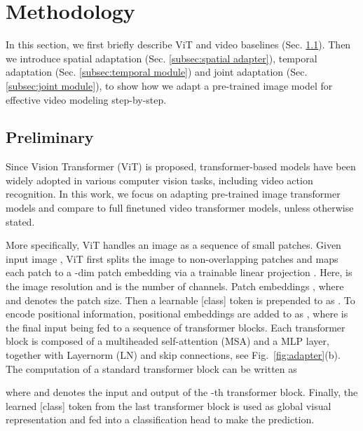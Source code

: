 \documentclass{article} \usepackage{iclr2023_conference,times}
\begin{document}
	\section{Methodology}
	\label{sec:method}
	
	In this section, we first briefly describe ViT and video baselines (Sec. \ref{subsec:preliminary}). Then we introduce spatial adaptation (Sec. \ref{subsec:spatial adapter}), temporal adaptation (Sec. \ref{subsec:temporal module}) and joint adaptation (Sec. \ref{subsec:joint module}), to show how we adapt a pre-trained image model for effective video modeling step-by-step.


	\subsection{Preliminary}
	\label{subsec:preliminary}
	Since Vision Transformer (ViT) \citep{vit} is proposed, transformer-based models have been widely adopted in various computer vision tasks, including video action recognition. 
	In this work, we focus on adapting pre-trained image transformer models and compare to full finetuned video transformer models, unless otherwise stated. 
	
	More specifically, ViT handles an image as a sequence of small patches. 
	Given input image , ViT first splits the image to  non-overlapping patches and maps each patch to a -dim patch embedding via a trainable linear projection \citep{qian2021blending,qian2022makes}. 
	Here,  is the image resolution and  is the number of channels. Patch embeddings , where  and  denotes the patch size. 
	Then a learnable [class] token is prepended to  as . 
	To encode positional information, positional embeddings  are added to  as , where  is the final input being fed to a sequence of transformer blocks.
	Each transformer block is composed of a multiheaded self-attention (MSA) and a MLP layer, together with Layernorm (LN) and skip connections, see Fig.~\ref{fig:adapter}(b). 
The computation of a standard transformer block can be written as  
	
	
	where  and  denotes the input and output of the -th transformer block. Finally, the learned [class] token  from the last transformer block is used as global visual representation and fed into a classification head to make the prediction.
	
\end{document}
